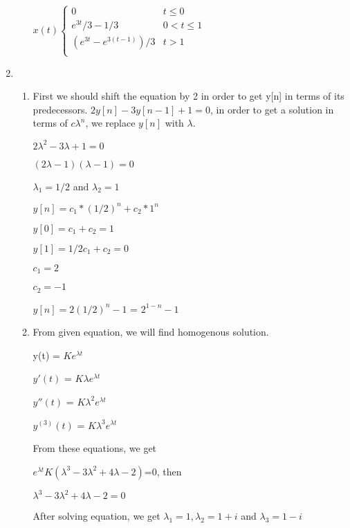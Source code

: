 \documentclass[10pt,a4paper, margin=1in]{article}
\begin{document}
\begin{enumerate}
\begin{enumerate}
    $
x(t)
\begin{cases} 
      0 & t \leq 0 \\
      e^{3t}/3 - 1/3 & 0 < t \leq 1 \\
      (e^{3t} - e^{3(t-1)})/3 & t> 1  \\
   \end{cases}
$
    
    
    \end{enumerate}

\item %
    \begin{enumerate}
    \item %
    First we should shift the equation by 2 in order to get y[n] in terms of its predecessors.
    $2y[n]-3y[n-1]+1=0$, in order to get a solution in terms of $c\lambda^{n}$, we replace $y[n]$ with $\lambda$.
    \vspace{0.25cm}
    
    $2\lambda^2 - 3\lambda + 1 = 0$
    
    $(2\lambda-1)(\lambda-1) = 0$
    
    $\lambda_{1}=1/2$ and $\lambda_{2}=1$
    
    $y[n] = c_1*(1/2)^{n}+c_2*1^{n}$
    
    $y[0] = c_1 + c_2 = 1$
    
    $y[1] = 1/2c_1 + c_2 = 0$
    
    $c_1 = 2$
    
    $c_2 = -1$
    
    $y[n] = 2(1/2)^{n}-1$ = $2^{1-n}-1$
    
    \item %
    From given equation, we will find homogenous solution.
    
    y(t) = $Ke^{\lambda t}$
    
    $y'(t)$ = $K \lambda e^{\lambda t}$
    
    $y''(t)$ = $K \lambda^2 e^{\lambda t}$
    
    $y^{(3)}(t)$ = $K \lambda^3 e^{\lambda t}$
    
    From these equations, we get
    
    $e^{\lambda t}K(\lambda^3 -3\lambda^2 +4\lambda - 2)$=0, then
    
    $\lambda^3 -3\lambda^2 +4\lambda - 2 = 0$
    
    After solving equation, we get $\lambda_1=1, \lambda_2=1+i$ and $\lambda_3=1-i$
    \vspace{0.25cm}
    

\end{enumerate}
\end{enumerate}
\end{document}
